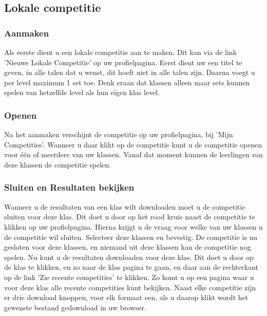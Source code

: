 \documentclass[11pt,a4paper]{report}
\begin{document}
\subsection{Lokale competitie}
\subsubsection{Aanmaken}
Als eerste dient u een lokale competitie aan te maken. Dit kan via de link 'Nieuwe Lokale Competitie' op uw profielpagina. Eerst dient uw een titel te geven, in alle talen dat u wenst, dit hoeft niet in alle talen zijn. Daarna voegt u per level maximum 1 set toe. Denk eraan dat klassen alleen maar sets kunnen spelen van hetzelfde level als hun eigen klas level. 
\subsubsection{Openen}
Na het aanmaken verschijnt de competitie op uw profielpagina, bij 'Mijn Competities'. Wanneer u daar klikt op de competitie kunt u de competitie openen voor \'e\'en of meerdere van uw klassen. Vanaf dat moment kunnen de leerlingen van deze klassen de competitie spelen.

\subsubsection{Sluiten en Resultaten bekijken}
Wanneer u de resultaten van een klas wilt downloaden moet u de competitie sluiten voor deze klas. Dit doet u door op het rood kruis naast de competitie te klikken op uw profielpagina. Hierna krijgt u de vraag voor welke van uw klassen u de competitie wil sluiten. Selecteer deze klassen en bevestig. De competitie is nu gesloten voor deze klassen, en niemand uit deze klassen kan de competitie nog spelen. Nu kunt u de resultaten downloaden voor deze klas. Dit doet u door op de klas te klikken, en zo naar de klas pagina te gaan, en daar aan de rechterkant op de link 'Zie recente competities' te klikken. Zo komt u op een pagina waar u voor deze klas alle recente competities kunt bekijken. Naast elke competitie zijn er drie download knoppen, voor elk formaat een, als u daarop klikt wordt het gewenste bestand gedownload in uw browser.
\end{document}
